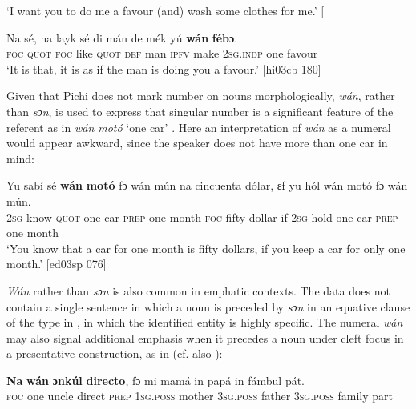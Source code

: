 \glt ‘I want you to do me a favour (and) wash some clothes for me.’ [\textstylePichiexamplenumberZchnZchn{ru03wt 030]}
\z


\ea%
    \label{ex:key:176}
    \gll Na  sé,    na  layk  sé    di  mán  de  mék    yú    \textbf{wán} \textbf{   fébɔ}.\\
\textsc{foc}  \textsc{quot}    \textsc{foc}  like  \textsc{quot}    \textsc{def}  man  \textsc{ipfv}  make  \textsc{2sg.indp}  one    favour\\

\glt ‘It is that, it is as if the man is doing you a favour.’ [hi03cb 180]
\z

Given that Pichi does not mark number on nouns morphologically, \textit{wán}, rather than \textit{sɔn}, is used to express that singular number is a significant feature of the referent as in \textit{wán motó} ‘one car’ . Here an interpretation of \textit{wán} as a numeral would appear awkward, since the speaker does not have more than one car in mind:


\ea%
    \label{ex:key:177}
    \gll Yu  sabí    sé    \textbf{wán}    \textbf{motó}  fɔ  wán  mún    na  cincuenta  dólar,
ɛf  yu  hól    wán    motó  fɔ  wán  mún.\\
\textsc{2sg}  know  \textsc{quot}    one    car    \textsc{prep}  one  month  \textsc{foc}  fifty      dollar
if  \textsc{2sg}  hold    one    car    \textsc{prep}  one  month  \\


\glt ‘You know that a car for one month is fifty dollars, if you keep a car for only one month.’
[ed03sp 076]
\z

\textit{Wán} rather than \textit{sɔn} is also common in emphatic contexts. The data does not contain a single sentence in which a noun is preceded by \textit{sɔn} in an equative clause of the type in , in which the identified entity is highly specific. The numeral \textit{wán} may also signal additional emphasis when it precedes a noun under cleft focus in a presentative construction, as in  (cf. also ): 


\ea%
    \label{ex:key:178}
    \gll \textbf{Na}  \textbf{wán}    \textbf{ɔnkúl}  \textbf{directo},  fɔ  mi    mamá  in    papá
in    fámbul  pát.\\
\textsc{foc}  one    uncle  direct  \textsc{prep}  \textsc{1sg.poss}  mother  \textsc{3sg.poss}  father
\textsc{3sg.poss}  family  part\\

